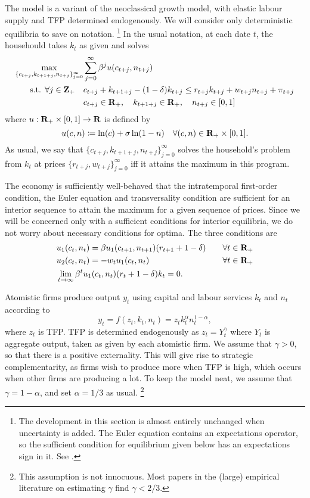 \documentclass[11pt,letterpaper,reqno,oneside]{article}
\begin{document}
The model is a variant of the neoclassical growth model, with elastic labour supply and TFP determined endogenously. We will consider only deterministic equilibria to save on notation.%
	\footnote{The development in this section is almost entirely unchanged when uncertainty is added. The Euler equation contains an expectations operator, so the sufficient condition for equilibrium given below has an expectations sign in it. See \textcite{ChristianoHarrison1999}.}
In the usual notation, at each date $t$, the househould takes $k_t$ as given and solves
%
\begin{align*}
	\max_{ \{ c_{t+j}, k_{t+1+j}, n_{t+j} \}_{j=0}^\infty }
	&\sum_{j=0}^\infty \beta^j u(c_{t+j},n_{t+j}) 
	\\
	\text{s.t. $\forall j \in \mathbf{Z}_+$}\quad
	&c_{t+j} + k_{t+1+j} - (1-\delta) k_{t+j} 
	\leq r_{t+j} k_{t+j} + w_{t+j} n_{t+j} + \pi_{t+j} 
	\\
	&c_{t+j} \in \mathbf{R}_+, 
	\quad k_{t+1+j} \in \mathbf{R}_+, 
	\quad n_{t+j} \in [0,1] 
\end{align*}
%
where $u : \mathbf{R}_+ \times [0,1] \to \mathbf{R}$ is defined by
%
\begin{equation*}
	u(c,n) \coloneqq \ln(c) + \sigma \ln(1-n) 
	\quad \forall (c,n) \in \mathbf{R}_+ \times [0,1] .
\end{equation*}
%
As usual, we say that $\{ c_{t+j}, k_{t+1+j}, n_{t+j} \}_{j=0}^\infty$ solves the household's problem from $k_t$ at prices $\{ r_{t+j}, w_{t+j} \}_{j=0}^\infty$ iff it attains the maximum in this program.


The economy is sufficiently well-behaved that the intratemporal first-order condition, the Euler equation and transversality condition are sufficient for an interior sequence to attain the maximum for a given sequence of prices. Since we will be concerned only with a sufficient conditions for interior equilibria, we do not worry about necessary conditions for optima. The three conditions are
%
\begin{align*}
	&u_1(c_t,n_t) 
	= \beta u_1(c_{t+1},n_{t+1}) ( r_{t+1} + 1 - \delta )
	&\quad\forall t \in \mathbf{R}_+
	\\
	&u_2(c_t,n_t) 
	= - w_t u_1(c_t,n_t)
	&\quad\forall t \in \mathbf{R}_+
	\\
	&\lim_{t \to \infty} 
	\beta^t u_1(c_t,n_t) (r_t+1-\delta) k_t = 0 .
	&
\end{align*}


Atomistic firms produce output $y_t$ using capital and labour services $k_t$ and $n_t$ according to
%
\begin{equation*}
	y_t = f(z_t,k_t,n_t) = z_t k_t^\alpha n_t^{1-\alpha} ,
\end{equation*}
%
where $z_t$ is TFP. TFP is determined endogenously as $z_t = Y_t^\gamma$ where $Y_t$ is aggregate output, taken as given by each atomistic firm. We assume that $\gamma>0$, so that there is a positive externality. This will give rise to strategic complementarity, as firms wish to produce more when TFP is high, which occurs when other firms are producing a lot. To keep the model neat, we assume that $\gamma=1-\alpha$, and set $\alpha=1/3$ as usual.%
	\footnote{This assumption is not innocuous. Most papers in the (large) empirical literature on estimating $\gamma$ find $\gamma<2/3$.}
\end{document}
